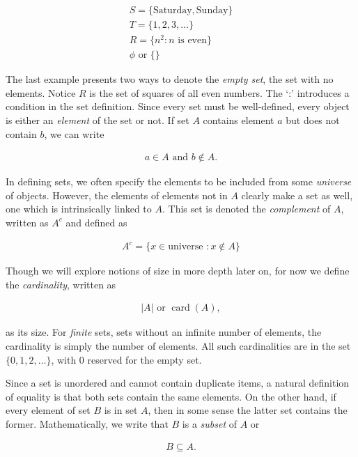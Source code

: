 \documentclass[twoside]{report}
\DeclareMathOperator{\card}{card}
\begin{document}
\begin{align*}
	S = \{\text{Saturday}, \text{Sunday}\} \\
	T = \{1, 2, 3, \dots \} \\
	R = \{n^2 : n \text{ is even} \} \\
	\phi \text{ or } \{ \}
\end{align*}

The last example presents two ways to denote the \emph{empty set}, the set with no elements. Notice $R$ is the set of squares of all even numbers. The `:' introduces a condition in the set definition. Since every set must be well-defined, every object is either an \emph{element} of the set or not. If set $A$ contains element $a$ but does not contain $b$, we can write

\begin{align*}
	a \in A \text{ and } b \notin A.
\end{align*}

In defining sets, we often specify the elements to be included from some \emph{universe} of objects. However, the elements of elements not in $A$ clearly make a set as well, one which is intrinsically linked to $A$. This set is denoted the \emph{complement} of $A$, written as $A^c$ and defined as

\begin{align*}
	A^c = \{ x \in \text{universe } : x \notin A \}
\end{align*}

Though we will explore notions of size in more depth later on, for now we define the \emph{cardinality}, written as 

\begin{align*}
	|A| \text{ or } \card(A),
\end{align*}

as its size. For \emph{finite} sets, sets without an infinite number of elements, the cardinality is simply the number of elements. All such cardinalities are in the set $\{0, 1, 2, \dots\}$, with 0 reserved for the empty set.

Since a set is unordered and cannot contain duplicate items, a natural definition of equality is that both sets contain the same elements. On the other hand, if every element of set $B$ is in set $A$, then in some sense the latter set contains the former. Mathematically, we write that $B$ is a \emph{subset} of $A$ or

\begin{align*}
	B \subseteq A.
\end{align*}
\end{document}
